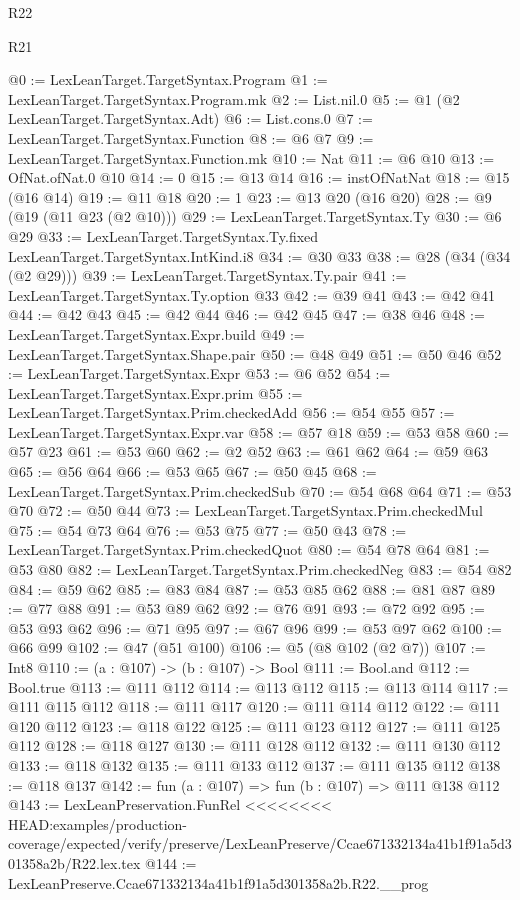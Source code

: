 \begin{lexlean}{R22}
\begin{lexlean}{R21}
\begin{coremodule}
{{{{{@0 := LexLeanTarget.TargetSyntax.Program
@1 := LexLeanTarget.TargetSyntax.Program.mk
@2 := List.nil.{0}
@5 := @1 (@2 LexLeanTarget.TargetSyntax.Adt)
@6 := List.cons.{0}
@7 := LexLeanTarget.TargetSyntax.Function
@8 := @6 @7
@9 := LexLeanTarget.TargetSyntax.Function.mk
@10 := Nat
@11 := @6 @10
@13 := OfNat.ofNat.{0} @10
@14 := 0
@15 := @13 @14
@16 := instOfNatNat
@18 := @15 (@16 @14)
@19 := @11 @18
@20 := 1
@23 := @13 @20 (@16 @20)
@28 := @9 (@19 (@11 @23 (@2 @10)))
@29 := LexLeanTarget.TargetSyntax.Ty
@30 := @6 @29
@33 := LexLeanTarget.TargetSyntax.Ty.fixed LexLeanTarget.TargetSyntax.IntKind.i8
@34 := @30 @33
@38 := @28 (@34 (@34 (@2 @29)))
@39 := LexLeanTarget.TargetSyntax.Ty.pair
@41 := LexLeanTarget.TargetSyntax.Ty.option @33
@42 := @39 @41
@43 := @42 @41
@44 := @42 @43
@45 := @42 @44
@46 := @42 @45
@47 := @38 @46
@48 := LexLeanTarget.TargetSyntax.Expr.build
@49 := LexLeanTarget.TargetSyntax.Shape.pair
@50 := @48 @49
@51 := @50 @46
@52 := LexLeanTarget.TargetSyntax.Expr
@53 := @6 @52
@54 := LexLeanTarget.TargetSyntax.Expr.prim
@55 := LexLeanTarget.TargetSyntax.Prim.checkedAdd
@56 := @54 @55
@57 := LexLeanTarget.TargetSyntax.Expr.var
@58 := @57 @18
@59 := @53 @58
@60 := @57 @23
@61 := @53 @60
@62 := @2 @52
@63 := @61 @62
@64 := @59 @63
@65 := @56 @64
@66 := @53 @65
@67 := @50 @45
@68 := LexLeanTarget.TargetSyntax.Prim.checkedSub
@70 := @54 @68 @64
@71 := @53 @70
@72 := @50 @44
@73 := LexLeanTarget.TargetSyntax.Prim.checkedMul
@75 := @54 @73 @64
@76 := @53 @75
@77 := @50 @43
@78 := LexLeanTarget.TargetSyntax.Prim.checkedQuot
@80 := @54 @78 @64
@81 := @53 @80
@82 := LexLeanTarget.TargetSyntax.Prim.checkedNeg
@83 := @54 @82
@84 := @59 @62
@85 := @83 @84
@87 := @53 @85 @62
@88 := @81 @87
@89 := @77 @88
@91 := @53 @89 @62
@92 := @76 @91
@93 := @72 @92
@95 := @53 @93 @62
@96 := @71 @95
@97 := @67 @96
@99 := @53 @97 @62
@100 := @66 @99
@102 := @47 (@51 @100)
@106 := @5 (@8 @102 (@2 @7))
@107 := Int8
@110 := (a : @107) -> (b : @107) -> Bool
@111 := Bool.and
@112 := Bool.true
@113 := @111 @112
@114 := @113 @112
@115 := @113 @114
@117 := @111 @115 @112
@118 := @111 @117
@120 := @111 @114 @112
@122 := @111 @120 @112
@123 := @118 @122
@125 := @111 @123 @112
@127 := @111 @125 @112
@128 := @118 @127
@130 := @111 @128 @112
@132 := @111 @130 @112
@133 := @118 @132
@135 := @111 @133 @112
@137 := @111 @135 @112
@138 := @118 @137
@142 := fun (a : @107) => fun (b : @107) => @111 @138 @112
@143 := LexLeanPreservation.FunRel
<<<<<<<< HEAD:examples/production-coverage/expected/verify/preserve/LexLeanPreserve/Ccae671332134a41b1f91a5d301358a2b/R22.lex.tex
@144 := LexLeanPreserve.Ccae671332134a41b1f91a5d301358a2b.R22.__prog
}}}}}
\end{coremodule}
\end{lexlean}
\end{lexlean}
